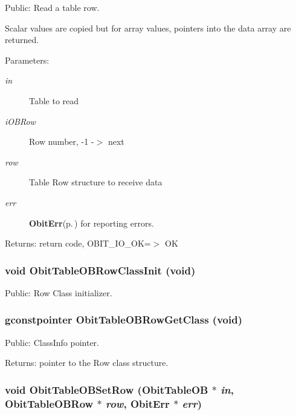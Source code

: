 Public: Read a table row. 

Scalar values are copied but for array values, pointers into the data array are returned. \begin{Desc}
\item[Parameters:]
\begin{description}
\item[{\em in}]Table to read \item[{\em i\-OBRow}]Row number, -1 -$>$ next \item[{\em row}]Table Row structure to receive data \item[{\em err}]{\bf Obit\-Err}{\rm (p.\,\pageref{structObitErr})} for reporting errors. \end{description}
\end{Desc}
\begin{Desc}
\item[Returns:]return code, OBIT\_\-IO\_\-OK=$>$ OK \end{Desc}
\subsubsection{\setlength{\rightskip}{0pt plus 5cm}void Obit\-Table\-OBRow\-Class\-Init (void)}\label{ObitTableOB_8h_a7}


Public: Row Class initializer. 

\subsubsection{\setlength{\rightskip}{0pt plus 5cm}gconstpointer Obit\-Table\-OBRow\-Get\-Class (void)}\label{ObitTableOB_8h_a9}


Public: Class\-Info pointer. 

\begin{Desc}
\item[Returns:]pointer to the Row class structure. \end{Desc}
\subsubsection{\setlength{\rightskip}{0pt plus 5cm}void Obit\-Table\-OBSet\-Row ({\bf Obit\-Table\-OB} $\ast$ {\em in}, {\bf Obit\-Table\-OBRow} $\ast$ {\em row}, {\bf Obit\-Err} $\ast$ {\em err})}\label{ObitTableOB_8h_a19}



